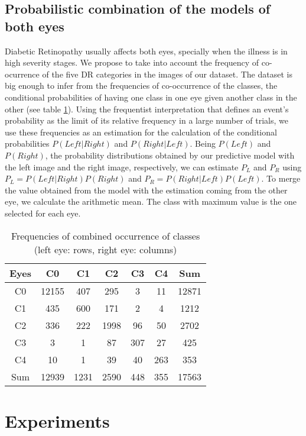 \documentclass{IOS-Book-Article}
\begin{document}
\subsection{Probabilistic combination of the models of both eyes}

Diabetic Retinopathy usually affects both eyes, specially when the illness is in high severity stages. We propose to take into account the frequency of co-ocurrence of the five DR categories in the images of our dataset. The dataset is big enough to infer from the frequencies of co-occurrence of the classes, the conditional probabilities of having one class in one eye given another class in the other (see table \ref{table-frequencies}). Using the frequentist interpretation that defines an event's probability as the limit of its relative frequency in a large number of trials, we use these frequencies as an estimation for the calculation of the conditional probabilities $P(Left|Right)$ and $P(Right|Left)$. Being $P(Left)$ and $P(Right)$, the probability distributions obtained by our predictive model with the left image and the right image, respectively, we can estimate $P_L$ and $P_R$ using $P_L = P(Left|Right)P(Right)$ and  $P_R = P(Right|Left)P(Left)$. To merge the value obtained from the model with the estimation coming from the other eye, we calculate the arithmetic mean. The class with maximum value is the one selected for each eye.

\begin{table}[ht!]
	\centering
	\begin{tabular}{c c c c c c c} 
		\hline
		Eyes & C0 & C1 & C2 & C3 & C4 & Sum\\ [0.5ex] 
		\hline\hline
		C0 & 12155 & 407 & 295 & 3 & 11 & 12871\\
		C1 & 435 & 600 & 171 & 2 & 4 & 1212\\
		C2 & 336 & 222 & 1998 & 96 & 50 & 2702\\
		C3 & 3 & 1 & 87 & 307 & 27 & 425\\
		C4 & 10 & 1 & 39 & 40 & 263 & 353\\		
		Sum & 12939 & 1231 & 2590 & 448 & 355 & 17563\\
		\hline
	\end{tabular}
	\caption{Frequencies of combined occurrence of classes (left eye: rows, right eye: columns)}
	\label{table-frequencies}
\end{table}

\section{Experiments}
\end{document}
